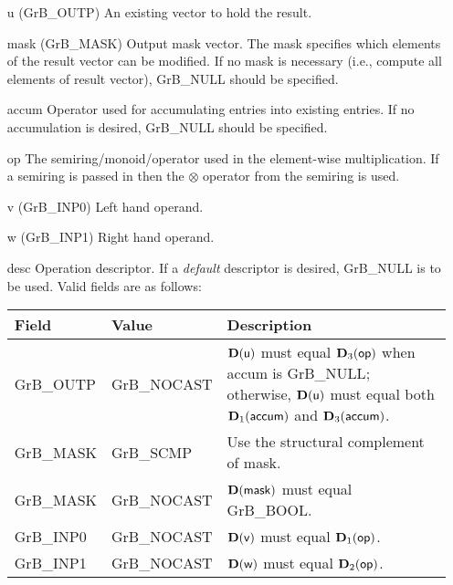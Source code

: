 \begin{itemize}[leftmargin=1.1in]
    \item[{\sf u}]     ({\sf GrB\_OUTP}) An existing vector to hold the result.

    \item[{\sf mask}]  ({\sf GrB\_MASK}) Output mask vector. The mask
    specifies which elements of the result vector can be modified.
    If no mask is necessary (i.e., compute all elements of result
    vector), {\sf GrB\_NULL} should be specified.

    \item[{\sf accum}]  Operator used for accumulating entries into existing
                        entries. If no accumulation is desired, 
                        {\sf GrB\_NULL} should be specified.

    \item[{\sf op}]    The semiring/monoid/operator used in the element-wise multiplication.
                       If a semiring is passed in then the $\otimes$  operator from
                                    the semiring is used.
    \item[{\sf v}]     ({\sf GrB\_INP0}) Left hand operand.
    \item[{\sf w}]     ({\sf GrB\_INP1}) Right hand operand.

    \item[{\sf desc}]  Operation descriptor. If a
    \emph{default} descriptor is desired, {\sf GrB\_NULL} is to be
    used. Valid fields are as follows: \\
    \begin{tabular}{llp{3in}}
        Field  & Value & Description \\
        \hline
        {\sf GrB\_OUTP} & {\sf GrB\_NOCAST} & $\bold{D}({\sf u})$ must equal $\bold{D}_3({\sf op})$
                                              when {\sf accum} is {\sf GrB\_NULL}; otherwise, 
                                              $\bold{D}({\sf u})$ must equal both 
                                              $\bold{D}_1({\sf accum})$ and $\bold{D}_3({\sf accum})$. \\
        {\sf GrB\_MASK} & {\sf GrB\_SCMP}   & Use the structural complement of {\sf mask}. \\
        {\sf GrB\_MASK} & {\sf GrB\_NOCAST} & $\bold{D}({\sf mask})$ must equal {\sf GrB\_BOOL}. \\
        {\sf GrB\_INP0} & {\sf GrB\_NOCAST} & $\bold{D}({\sf v})$ must equal $\bold{D}_1({\sf op})$. \\
        {\sf GrB\_INP1} & {\sf GrB\_NOCAST} & $\bold{D}({\sf w})$ must equal $\bold{D}_2({\sf op})$. \\
    \end{tabular}
\end{itemize}

